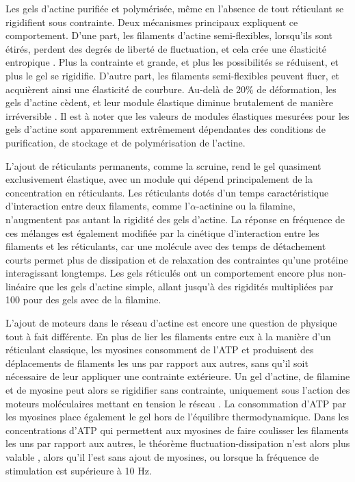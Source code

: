\documentclass{report}
\begin{document}
Les gels d'actine purifiée et polymérisée, même en l'absence de tout réticulant se rigidifient sous contrainte. Deux mécanismes principaux expliquent ce comportement. 
D'une part, les filaments d'actine semi-flexibles, lorsqu'ils sont étirés, perdent des degrés de liberté de fluctuation, et cela crée une élasticité entropique \cite{storm_2005}. Plus la contrainte et grande, et plus les possibilités se réduisent, et plus le gel se rigidifie. 
D'autre part, les filaments semi-flexibles peuvent fluer, et acquièrent ainsi une élasticité de courbure. 
Au-delà de 20\% de déformation, les gels d'actine cèdent, et leur module élastique diminue brutalement de manière irréversible \cite{janmey_1994}.
Il est à noter que les valeurs de modules élastiques mesurées pour les gels d'actine sont apparemment extrêmement dépendantes des conditions de purification, de stockage et de polymérisation de l'actine. 

L'ajout de réticulants permanents, comme la scruine, rend le gel quasiment exclusivement élastique, avec un module qui dépend principalement de la concentration en réticulants. 
Les réticulants dotés d'un temps caractéristique d'interaction entre deux filaments, comme l'$\alpha$-actinine ou la filamine, n'augmentent pas autant la rigidité des gels d'actine. 
La réponse en fréquence de ces mélanges est également modifiée par la cinétique d'interaction entre les filaments et les réticulants, car une molécule avec des temps de détachement courts permet plus de dissipation et de relaxation des contraintes qu'une protéine interagissant longtemps. 
Les gels réticulés ont un comportement encore plus non-linéaire que les gels d'actine simple, allant jusqu'à des rigidités multipliées par 100 pour des gels avec de la filamine. 

L'ajout de moteurs dans le réseau d'actine est encore une question de physique tout à fait différente. En plus de lier les filaments entre eux à la manière d'un réticulant classique, les myosines consomment de l'ATP et produisent des déplacements de filaments les uns par rapport aux autres, sans qu'il soit nécessaire de leur appliquer une contrainte extérieure. 
Un gel d'actine, de filamine et de myosine peut alors se rigidifier sans contrainte, uniquement sous l'action des moteurs moléculaires mettant en tension le réseau \cite{koenderink}. 
La consommation d'ATP par les myosines place également le gel hors de l'équilibre thermodynamique. Dans les concentrations d'ATP qui permettent aux myosines de faire coulisser les filaments les uns par rapport aux autres, le théorème fluctuation-dissipation n'est alors plus valable \cite{mizuno}, alors qu'il l'est sans ajout de myosines, ou lorsque la fréquence de stimulation est supérieure à 10 Hz. 
\end{document}
